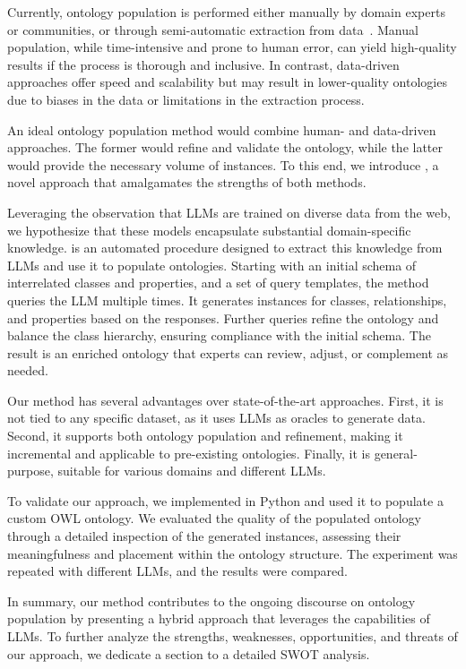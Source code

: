 Currently, ontology population is performed either manually by domain experts or communities, or through semi-automatic extraction from data~\cite{placeholder}.
%
Manual population, while time-intensive and prone to human error, can yield high-quality results if the process is thorough and inclusive.
%
In contrast, data-driven approaches offer speed and scalability but may result in lower-quality ontologies due to biases in the data or limitations in the extraction process.


An ideal ontology population method would combine human- and data-driven approaches.
%
The former would refine and validate the ontology, while the latter would provide the necessary volume of instances.
%
To this end, we introduce \llmfkg, a novel approach that amalgamates the strengths of both methods.


Leveraging the observation that \glspl{LLM} are trained on diverse data from the web, we hypothesize that these models encapsulate substantial domain-specific knowledge.
%
\llmfkg{} is an automated procedure designed to extract this knowledge from \glspl{LLM} and use it to populate ontologies.
%
Starting with an initial schema of interrelated classes and properties, and a set of query templates, the method queries the \gls{LLM} multiple times.
%
It generates instances for classes, relationships, and properties based on the responses.
%
Further queries refine the ontology and balance the class hierarchy, ensuring compliance with the initial schema.
%
The result is an enriched ontology that experts can review, adjust, or complement as needed.


Our method has several advantages over state-of-the-art approaches.
%
First, it is not tied to any specific dataset, as it uses \glspl{LLM} as oracles to generate data.
%
Second, it supports both ontology population and refinement, making it incremental and applicable to pre-existing ontologies.
%
Finally, it is general-purpose, suitable for various domains and different \glspl{LLM}.

%

To validate our approach, we implemented \llmfkg{} in Python and used it to populate a custom \gls{OWL} ontology.
%
We evaluated the quality of the populated ontology through a detailed inspection of the generated instances, assessing their meaningfulness and placement within the ontology structure.
%
The experiment was repeated with different \glspl{LLM}, and the results were compared.


In summary, our method contributes to the ongoing discourse on ontology population by presenting a hybrid approach that leverages the capabilities of \glspl{LLM}.
%
To further analyze the strengths, weaknesses, opportunities, and threats of our approach, we dedicate a section to a detailed \gls{SWOT} analysis.


